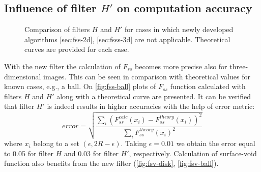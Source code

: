 \documentclass[1p]{elsarticle}
\begin{document}
\subsection{Influence of filter $H'$ on computation accuracy}
\label{sec:influence}
\begin{figure}
  \centering
  \hfill
  \hfill
  \caption[]{Comparison of filters $H$ and $H'$ for cases in which newly
    developed algorithms \cref{sec:fss-2d}, \cref{sec:fsss-3d} are not
    applicable. Theoretical curves are provided for each case.}
  \label{fig:not-covered}
\end{figure}
With the new filter the calculation of $F_{ss}$ becomes more precise also for
three-dimensional images. This can be seen in comparison with theoretical values
for known cases, e.g., a ball. On \cref{fig:fss-ball} plots
of $F_{ss}$ function calculated with filters $H$ and $H'$ along with a
theoretical curve are presented. It can be verified that filter $H'$ is indeed results 
in higher accuracies with the help of error metric:
\begin{equation}
  error = \sqrt{\frac{\sum_i (F_{ss}^{calc}(x_i) -
      F_{ss}^{theory}(x_i))^2}{\sum_i F_{ss}^{theory}(x_i)^2}}
  \label{eq:error}
\end{equation}
where $x_i$ belong to a set $(\epsilon, 2R - \epsilon)$. Taking
$\epsilon = 0.01$ we obtain the error equal to 0.05 for filter $H$ and 0.03 for
filter $H'$, respectively. Calculation of surface-void function also benefits
from the new filter (\cref{fig:fsv-disk}, \cref{fig:fsv-ball}).
\end{document}
